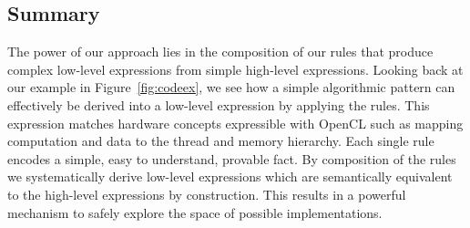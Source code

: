 \FloatBarrier



\subsection{Summary}

The power of our approach lies in the composition of our rules that produce complex low-level expressions from simple high-level expressions.
Looking back at our example in Figure~\ref{fig:codeex}, we see how a simple algorithmic pattern can effectively be derived into a low-level expression by applying the rules.
This expression matches hardware concepts expressible with OpenCL such as mapping computation and data to the thread and memory hierarchy. %
Each single rule encodes a simple, easy to understand, provable fact.
By composition of the rules we systematically derive low-level expressions which are semantically equivalent to the high-level expressions by construction.
This results in a powerful mechanism to safely explore the space of possible implementations.

